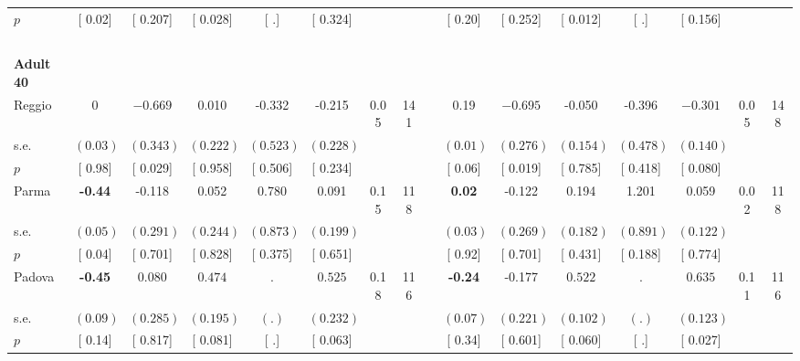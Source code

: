 \begin{longtable}{L{8em} c c c c c c c p{1em} c c c c c c c}
\quad \quad \quad \quad $ p$ & [     0.02] & [    0.207] & [    0.028] & [        .] & [    0.324] & & & & [     0.20] & [    0.252] & [    0.012] & [        .] & [    0.156] & &  \\[1em]
~\\[1em]
\quad \quad \textbf{Adult 40} & & & & & & & & & & & & & & & \\* 
\quad \quad \quad Reggio& 0 & $ \mathbf{   -0.669}$ &     0.010 &    -0.332 &    -0.215 &      0.05 &       141 & & 0.19 & $ \mathbf{   -0.695}$ &    -0.050 &    -0.396 & $ \mathbf{   -0.301}$ &      0.05 &       148  \\*
\quad \quad \quad \quad s.e.& $ (     0.03)$ & $ (    0.343)$ & $ (    0.222)$ & $ (    0.523)$ & $ (    0.228)$ & & & & $ (     0.01)$ & $ (    0.276)$ & $ (    0.154)$ & $ (    0.478)$ & $ (    0.140)$ & &  \\*
\quad \quad \quad \quad $ p$ & [     0.98] & [    0.029] & [    0.958] & [    0.506] & [    0.234] & & & & [     0.06] & [    0.019] & [    0.785] & [    0.418] & [    0.080] & &  \\[1em]
\quad \quad \quad Parma& \textbf{    -0.44} &    -0.118 &     0.052 &     0.780 &     0.091 &      0.15 &       118 & & \textbf{     0.02} &    -0.122 &     0.194 &     1.201 &     0.059 &      0.02 &       118  \\*
\quad \quad \quad \quad s.e.& $ (     0.05)$ & $ (    0.291)$ & $ (    0.244)$ & $ (    0.873)$ & $ (    0.199)$ & & & & $ (     0.03)$ & $ (    0.269)$ & $ (    0.182)$ & $ (    0.891)$ & $ (    0.122)$ & &  \\*
\quad \quad \quad \quad $ p$ & [     0.04] & [    0.701] & [    0.828] & [    0.375] & [    0.651] & & & & [     0.92] & [    0.701] & [    0.431] & [    0.188] & [    0.774] & &  \\[1em]
\quad \quad \quad Padova& \textbf{    -0.45} &     0.080 & $ \mathbf{    0.474}$ &         . & $ \mathbf{    0.525}$ &      0.18 &       116 & & \textbf{    -0.24} &    -0.177 & $ \mathbf{    0.522}$ &         . & $ \mathbf{    0.635}$ &      0.11 &       116  \\*
\quad \quad \quad \quad s.e.& $ (     0.09)$ & $ (    0.285)$ & $ (    0.195)$ & $ (        .)$ & $ (    0.232)$ & & & & $ (     0.07)$ & $ (    0.221)$ & $ (    0.102)$ & $ (        .)$ & $ (    0.123)$ & &  \\*
\quad \quad \quad \quad $ p$ & [     0.14] & [    0.817] & [    0.081] & [        .] & [    0.063] & & & & [     0.34] & [    0.601] & [    0.060] & [        .] & [    0.027] & &  \\[1em]

\end{longtable}
